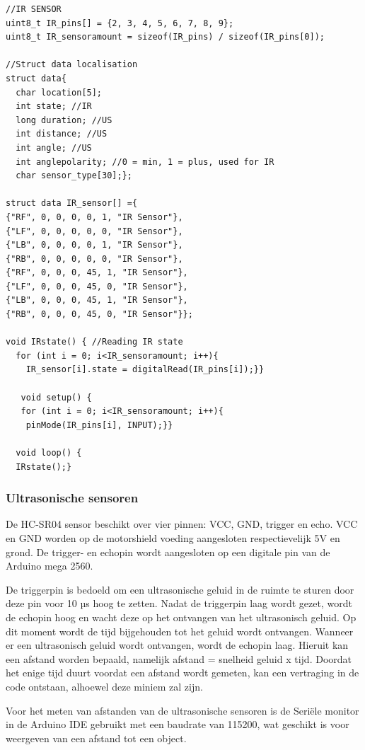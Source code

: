 \begin{lstlisting}
//IR SENSOR
uint8_t IR_pins[] = {2, 3, 4, 5, 6, 7, 8, 9};
uint8_t IR_sensoramount = sizeof(IR_pins) / sizeof(IR_pins[0]);

//Struct data localisation
struct data{
  char location[5];
  int state; //IR
  long duration; //US
  int distance; //US
  int angle; //US
  int anglepolarity; //0 = min, 1 = plus, used for IR
  char sensor_type[30];};

struct data IR_sensor[] ={
{"RF", 0, 0, 0, 0, 1, "IR Sensor"},
{"LF", 0, 0, 0, 0, 0, "IR Sensor"},
{"LB", 0, 0, 0, 0, 1, "IR Sensor"},
{"RB", 0, 0, 0, 0, 0, "IR Sensor"},
{"RF", 0, 0, 0, 45, 1, "IR Sensor"},
{"LF", 0, 0, 0, 45, 0, "IR Sensor"},
{"LB", 0, 0, 0, 45, 1, "IR Sensor"},
{"RB", 0, 0, 0, 45, 0, "IR Sensor"}};

void IRstate() { //Reading IR state
  for (int i = 0; i<IR_sensoramount; i++){
    IR_sensor[i].state = digitalRead(IR_pins[i]);}}
   
   void setup() {
   for (int i = 0; i<IR_sensoramount; i++){
    pinMode(IR_pins[i], INPUT);}}
  
  void loop() {
  IRstate();}
\end{lstlisting}
\subsubsection{Ultrasonische sensoren}
De HC-SR04 sensor beschikt over vier pinnen: VCC, GND, trigger en echo. VCC en GND worden op de motorshield voeding aangesloten respectievelijk 5V en grond. De trigger- en echopin wordt aangesloten op een digitale pin van de Arduino mega 2560\cite{HC-SR04}.

De triggerpin is bedoeld om een ultrasonische geluid in de ruimte te sturen door deze pin voor 10 µs hoog te zetten. Nadat de triggerpin laag wordt gezet, wordt de echopin hoog en wacht deze op het ontvangen van het ultrasonisch geluid. Op dit moment wordt de tijd bijgehouden tot het geluid wordt ontvangen. Wanneer er een ultrasonisch geluid wordt ontvangen, wordt de echopin laag. Hieruit kan een afstand worden bepaald, namelijk afstand = snelheid geluid x tijd. Doordat het enige tijd duurt voordat een afstand wordt gemeten, kan een vertraging in de code ontstaan, alhoewel deze miniem zal zijn.

Voor het meten van afstanden van de ultrasonische sensoren is de Seriële monitor  in de Arduino IDE gebruikt met een baudrate van 115200, wat geschikt is voor weergeven van  een afstand tot een object.

